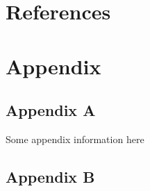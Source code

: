 \documentclass[11pt,preprint]{elsarticle}
\numberwithin{equation}{section}
\numberwithin{figure}{section}
\numberwithin{table}{section}
\begin{document}
\section*{References}\label{references}

\protect{}\label{refs}

\section*{Appendix}\label{appendix}

\subsection*{Appendix A}\label{appendix-a}

Some appendix information here

\subsection*{Appendix B}\label{appendix-b}


\end{document}
